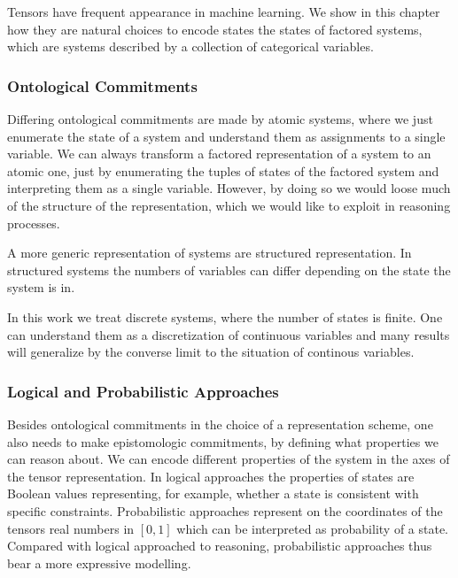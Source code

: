 
Tensors have frequent appearance in machine learning.
We show in this chapter how they are natural choices to encode states the states of factored systems, which are systems described by a collection of categorical variables.

\subsubsection{Ontological Commitments}


Differing ontological commitments are made by atomic systems, where we just enumerate the state of a system and understand them as assignments to a single variable.
We can always transform a factored representation of a system to an atomic one, just by enumerating the tuples of states of the factored system and interpreting them as a single variable.
However, by doing so we would loose much of the structure of the representation, which we would like to exploit in reasoning processes.


A more generic representation of systems are structured representation.
In structured systems the numbers of variables can differ depending on the state the system is in.

In this work we treat discrete systems, where the number of states is finite. 
One can understand them as a discretization of continuous variables and many results will generalize by the converse limit to the situation of continous variables.






\subsubsection{Logical and Probabilistic Approaches}

Besides ontological commitments in the choice of a representation scheme, one also needs to make epistomologic commitments, by defining what properties we can reason about.
We can encode different properties of the system in the axes of the tensor representation.
In logical approaches the properties of states are Boolean values representing, for example, whether a state is consistent with specific constraints.
Probabilistic approaches represent on the coordinates of the tensors real numbers in $[0,1]$ which can be interpreted as probability of a state.
Compared with logical approached to reasoning, probabilistic approaches thus bear a more expressive modelling.


